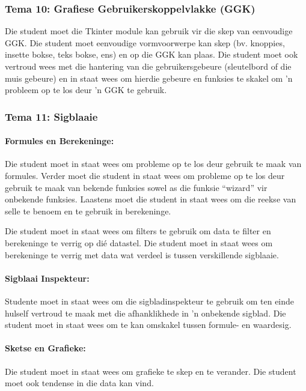 \subsubsection {Tema 10: Grafiese Gebruikerskoppelvlakke (GGK)} 
            Die student moet die Tkinter module kan gebruik vir die skep van 
            eenvoudige GGK. Die student moet eenvoudige 
            vormvoorwerpe kan skep (bv. knoppies, insette bokse, teks bokse, ens) en 
            op die GGK kan plaas. Die student moet ook
            vertroud wees met die hantering van die gebruikersgebeure (sleutelbord of die muis gebeure) 
            en in staat wees om hierdie gebeure en funksies te skakel om 
            'n probleem op te los deur 'n GGK te gebruik.


    \subsubsection{Tema 11: Sigblaaie}
        \paragraph{Formules en Berekeninge:}
            Die student moet in staat wees om probleme op te los deur gebruik 
            te maak van formules. Verder moet die student in staat wees om probleme
            op te los deur gebruik te maak van bekende funksies sowel as die
            funksie ``wizard'' vir onbekende funksies.  Laastens moet die student in staat
            wees om die reekse van selle te benoem en te gebruik in berekeninge.
            
    Die student moet in staat wees om filters te gebruik om data te filter
    en berekeninge te verrig op di\'{e} datastel.  Die student
    moet in staat wees om berekeninge te verrig met data wat verdeel is
    tussen verskillende sigblaaie.
    
        \paragraph{Sigblaai Inspekteur:}
    Studente moet in staat wees om die sigbladinspekteur te gebruik
    om ten einde hulself vertroud te maak met die afhanklikhede in 'n 
    onbekende sigblad.  Die student moet in staat wees om te kan omskakel 
    tussen formule- en waardesig.

        \paragraph{Sketse en Grafieke:}
            Die student moet in staat wees om grafieke te skep en te verander.
            Die student moet ook tendense in die data kan vind.          

